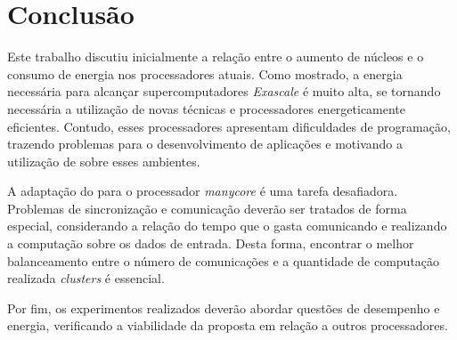 \chapter{Conclusão}
\label{cha:conclusao}
Este trabalho discutiu inicialmente a relação entre o aumento de núcleos e o consumo de
energia nos processadores atuais. Como mostrado, a energia necessária para alcançar supercomputadores
\textit{Exascale} é muito alta, se tornando necessária a utilização de
novas técnicas e processadores energeticamente eficientes. Contudo, esses
processadores apresentam dificuldades de programação, trazendo problemas para o desenvolvimento
de aplicações e motivando a utilização de \fws sobre esses ambientes.

A adaptação do \fw para o processador \textit{manycore} \mppa é uma
tarefa desafiadora. Problemas de sincronização e comunicação deverão ser
tratados de forma especial, considerando a relação do tempo que o \fw gasta
comunicando e realizando a computação sobre os dados de entrada. Desta forma,
encontrar o melhor balanceamento entre o número de comunicações e a
quantidade de computação realizada \textit{clusters} é essencial.

Por fim, os experimentos realizados deverão abordar questões de desempenho e
energia, verificando a viabilidade da proposta em relação a outros
processadores.

